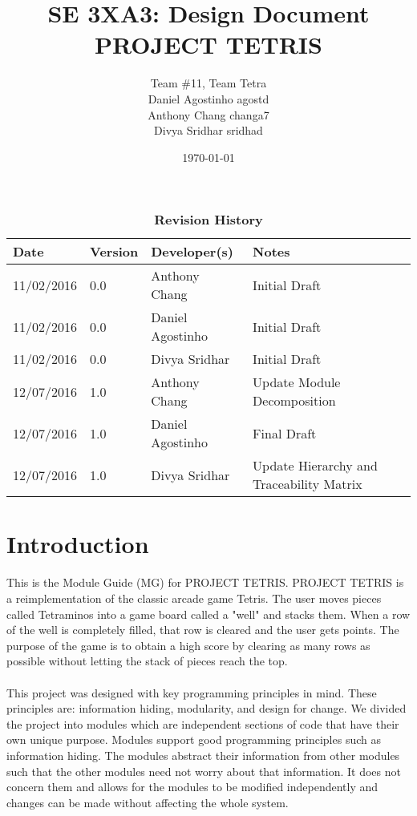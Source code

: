\documentclass[12pt, titlepage]{article}
\title{SE 3XA3: Design Document\\PROJECT TETRIS}
\author{Team \#11, Team Tetra
		\\ Daniel Agostinho agostd
		\\ Anthony Chang changa7
		\\ Divya Sridhar sridhad
}
\date{\today}
\begin{document}
\maketitle
{}
\tableofcontents
\listoftables
\listoffigures
\begin{table}[bp]
\caption{\bf Revision History}
\begin{tabularx}{\textwidth}{p{3cm}p{2cm}p{4cm}X}
\toprule {\bf Date} & {\bf Version} & {\bf Developer(s)} & {\bf Notes}\\
\midrule
11/02/2016 & 0.0 & Anthony Chang & Initial Draft\\
11/02/2016 & 0.0 &  Daniel Agostinho & Initial Draft\\
11/02/2016 & 0.0 & Divya Sridhar & Initial Draft\\
12/07/2016 & 1.0 & Anthony Chang & Update Module Decomposition\\
12/07/2016 & 1.0 &  Daniel Agostinho & Final Draft\\
12/07/2016 & 1.0 & Divya Sridhar & Update Hierarchy and Traceability Matrix\\
\bottomrule
\end{tabularx}
\end{table}
\newpage
{}

\section{Introduction}
	This is the Module Guide (MG) for PROJECT TETRIS. PROJECT TETRIS is a reimplementation of the classic arcade game Tetris. The user moves pieces called Tetraminos into a game board called a "well" and stacks them. When a row of the well is completely filled, that row is cleared and the user gets points. The purpose of the game is to obtain a high score by clearing as many rows as possible without letting the stack of pieces reach the top. 
\paragraph{}
	This project was designed with key programming principles in mind. These principles are: information hiding, modularity, and design for change. We divided the project into modules which are independent sections of code that have their own unique purpose. Modules support good programming principles such as information hiding. The modules abstract their information from other modules such that the other modules need not worry about that information. It does not concern them and allows for the modules to be modified independently and changes can be made without affecting the whole system.
\end{document}
